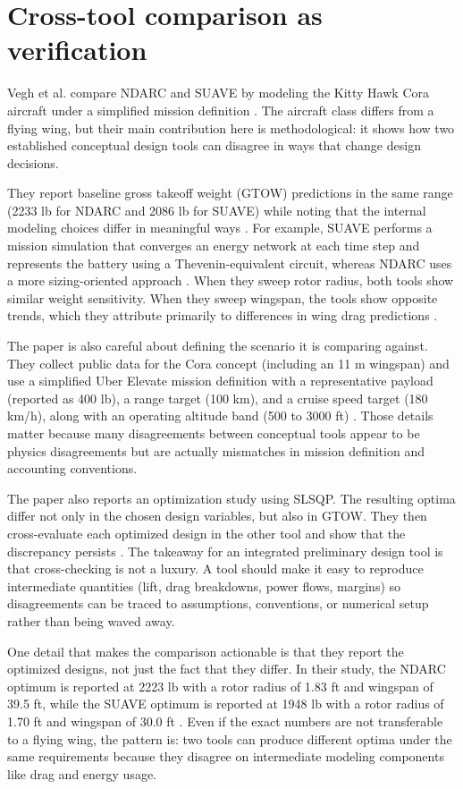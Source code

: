 \section{Cross-tool comparison as verification}
Vegh et al. compare NDARC and SUAVE by modeling the Kitty Hawk Cora aircraft under a simplified mission definition \cite{Vegh2019NDARCSUAVE}. The aircraft class differs from a flying wing, but their main contribution here is methodological: it shows how two established conceptual design tools can disagree in ways that change design decisions.

They report baseline gross takeoff weight (GTOW) predictions in the same range (2233 lb for NDARC and 2086 lb for SUAVE) while noting that the internal modeling choices differ in meaningful ways \cite{Vegh2019NDARCSUAVE}. For example, SUAVE performs a mission simulation that converges an energy network at each time step and represents the battery using a Thevenin-equivalent circuit, whereas NDARC uses a more sizing-oriented approach \cite{Vegh2019NDARCSUAVE}. When they sweep rotor radius, both tools show similar weight sensitivity. When they sweep wingspan, the tools show opposite trends, which they attribute primarily to differences in wing drag predictions \cite{Vegh2019NDARCSUAVE}.

The paper is also careful about defining the scenario it is comparing against. They collect public data for the Cora concept (including an 11 m wingspan) and use a simplified Uber Elevate mission definition with a representative payload (reported as 400 lb), a range target (100 km), and a cruise speed target (180 km/h), along with an operating altitude band (500 to 3000 ft) \cite{Vegh2019NDARCSUAVE}. Those details matter because many disagreements between conceptual tools appear to be physics disagreements but are actually mismatches in mission definition and accounting conventions.

The paper also reports an optimization study using SLSQP. The resulting optima differ not only in the chosen design variables, but also in GTOW. They then cross-evaluate each optimized design in the other tool and show that the discrepancy persists \cite{Vegh2019NDARCSUAVE}. The takeaway for an integrated preliminary design tool is that cross-checking is not a luxury. A tool should make it easy to reproduce intermediate quantities (lift, drag breakdowns, power flows, margins) so disagreements can be traced to assumptions, conventions, or numerical setup rather than being waved away.

One detail that makes the comparison actionable is that they report the optimized designs, not just the fact that they differ. In their study, the NDARC optimum is reported at 2223 lb with a rotor radius of 1.83 ft and wingspan of 39.5 ft, while the SUAVE optimum is reported at 1948 lb with a rotor radius of 1.70 ft and wingspan of 30.0 ft \cite{Vegh2019NDARCSUAVE}. Even if the exact numbers are not transferable to a flying wing, the pattern is: two tools can produce different optima under the same requirements because they disagree on intermediate modeling components like drag and energy usage.

